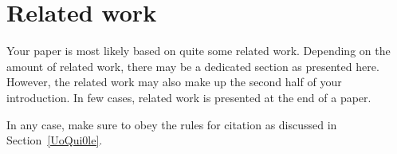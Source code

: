 \section{Related work}
Your paper is most likely based on quite some related work.
Depending on the amount of related work, there may be a dedicated section as
presented here.
However, the related work may also make up the second half of your
introduction.
In few cases, related work is presented at the end of a paper.

In any case, make sure to obey the rules for citation as discussed in
Section~\ref{UoQui0le}.
